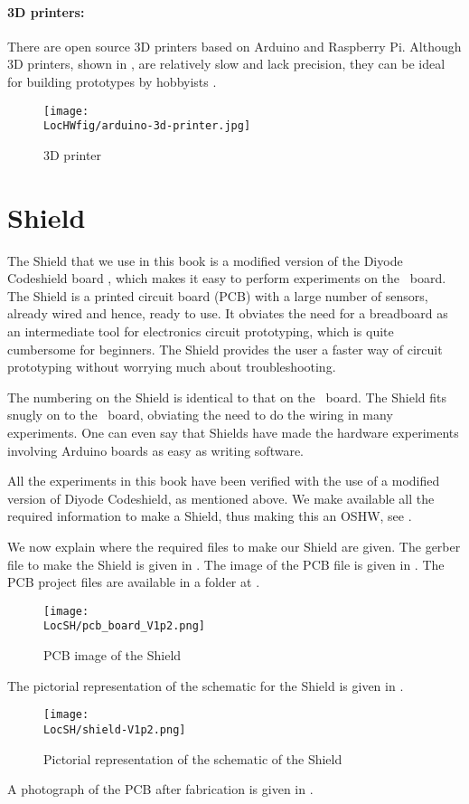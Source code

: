 \paragraph{3D printers:} There are open source 3D printers based on
Arduino and  Raspberry Pi. Although 3D printers, shown in ,
are relatively slow and lack precision, they can be ideal for building prototypes by
hobbyists \cite{3d-printer-ref}.
\begin{figure}
  \centering
  \texttt{[image: \\LocHWfig/arduino-3d-printer.jpg]}
  \caption{3D printer}
  \label{3dprinter}
\end{figure}

\section{Shield}\label{shield-hw}
The Shield that we use in this book is a modified version of the Diyode Codeshield
board \cite{shield-ref}, which makes it easy to perform
experiments on the \arduino\ board.  The Shield is a printed circuit
board (PCB) with a large number of sensors, already wired and hence,
ready to use.  It obviates the need for a breadboard as an
intermediate tool for electronics circuit prototyping, which is quite
cumbersome for beginners.  The Shield provides the user a faster way
of circuit prototyping without worrying much about troubleshooting.

The numbering on the Shield is identical to that on
the \arduino\ board.  The Shield fits snugly on to the \arduino\
board, obviating the need to do the wiring in many experiments.  One
can even say that Shields have made the hardware experiments involving
Arduino boards as easy as writing software.

All the experiments in this book have been verified with the use of a
modified version of Diyode Codeshield, as mentioned above.  We make
available all the required information to make a Shield, thus making
this an OSHW, see \secref{sec:oshw}.

We now explain where the required files to make our Shield are given.
The gerber file to make the Shield is given in
. The image of the PCB file is given in
. The PCB project files are available in a
folder at \LocSHbrief{kicad-import}.
\begin{figure}
  \centering
  \texttt{[image: \\LocSH/pcb\_board\_V1p2.png]}
  \caption[PCB image of the Shield]{PCB image of the Shield}
  \label{fig:PCB-image}
\end{figure}
The pictorial representation of the schematic for the Shield is given
in \figref{fig:sch-shield}.
\begin{figure}
  \centering
  \texttt{[image: \\LocSH/shield-V1p2.png]}
  \caption{Pictorial representation of the schematic of the Shield}
  \label{fig:sch-shield}
\end{figure}
A photograph of the PCB after fabrication is given in
.

